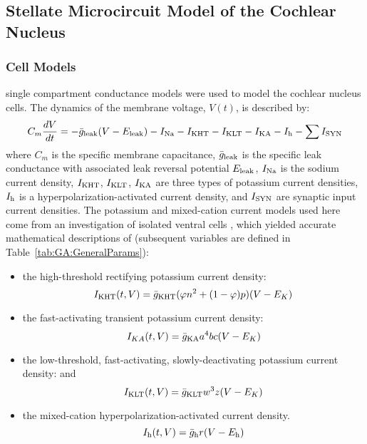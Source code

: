 \subsection{Stellate Microcircuit Model of the Cochlear Nucleus}\label{sec:GA:stell-micr-model}

\subsubsection{Cell Models}\label{sec:GA:cell-models}

\HH single compartment conductance models
\citep{HodgkinHuxley:1952a} were used to model the cochlear nucleus
cells. The dynamics of the membrane voltage, $V(t)$, is described by:
\begin{equation} \label{eq:GA:5} 
C_{m} \frac{dV}{dt} =-\bar{g}_{{\rm
      leak}} (V-E_{{\rm leak}} )-I_{{\rm Na}} -I_{{\rm KHT}} -I_{{\rm
      KLT}} -I_{{\rm KA}} -I_{{\rm h}} -\sum I_{{\rm SYN}}
\end{equation}
\noindent where $C_{m}$ is the specific membrane capacitance,
$\bar{g}_{{\rm leak}} $ is the specific leak conductance with
associated leak reversal potential $E_{{\rm leak}} $, $I_{{\rm Na}} $
is the sodium current density, $I_{{\rm KHT}} $, $I_{{\rm KLT}} $,
$I_{{\rm KA}} $ are three types of potassium current densities,
$I_{{\rm h}} $ is a hyperpolarization-activated current density, and
$I_{{\rm SYN}} $ are synaptic input current densities.  The potassium
and mixed-cation current models used here come from an investigation
of isolated ventral {\CN} cells
\citep{RothmanManis:2003,RothmanManis:2003a,RothmanManis:2003b}, which
yielded accurate mathematical descriptions of (subsequent variables
are defined in Table~\ref{tab:GA:GeneralParams}):
\begin{itemize}
\item the high-threshold rectifying potassium current density:
  \begin{equation} \label{eq:GA:6} 
I_{{\rm KHT}}(t,V)=\bar{g}_{{\rm KHT}} (\varphi n^{2} + (1-\varphi ) p)(V-E_{K} )
  \end{equation}
\item the fast-activating transient potassium current density:
  \begin{equation} \label{eq:GA:7} 
I_{KA} (t,V)=\bar{g}_{{\rm KA}} a^{4} b c (V-E_{K})
  \end{equation}
\item the low-threshold, fast-activating, slowly-deactivating
  potassium current density: and
  \begin{equation} \label{eq:GA:8} 
I_{{\rm KLT}}(t,V)=\bar{g}_{{\rm KLT}} w^{3} z (V-E_{K} )
  \end{equation}
\item the mixed-cation hyperpolarization-activated current density.
  \begin{equation} \label{eq:GA:9} 
I_{{\rm h}} (t,V)=\bar{g}_{{\rm h}} r (V-E_{{\rm h}} )
  \end{equation}
\end{itemize}

